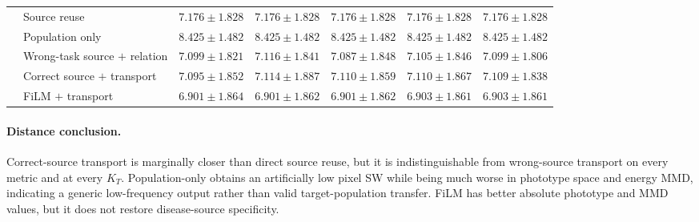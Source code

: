 \documentclass{article}
\newcommand{\KT}{K_T}
\begin{document}
\begin{table}[h]
{\begin{tabular}{llccccc}
& Source reuse & $7.176\pm1.828$ & $7.176\pm1.828$ & $7.176\pm1.828$ & $7.176\pm1.828$ & $7.176\pm1.828$ \\
& Population only & $8.425\pm1.482$ & $8.425\pm1.482$ & $8.425\pm1.482$ & $8.425\pm1.482$ & $8.425\pm1.482$ \\
& Wrong-task source $+$ relation & $7.099\pm1.821$ & $7.116\pm1.841$ & $7.087\pm1.848$ & $7.105\pm1.846$ & $7.099\pm1.806$ \\
& Correct source $+$ transport & $7.095\pm1.852$ & $7.114\pm1.887$ & $7.110\pm1.859$ & $7.110\pm1.867$ & $7.109\pm1.838$ \\
& FiLM $+$ transport & $6.901\pm1.864$ & $6.901\pm1.862$ & $6.901\pm1.862$ & $6.903\pm1.861$ & $6.903\pm1.861$ \\
\bottomrule
\end{tabular}}
\end{table}

\paragraph{Distance conclusion.}
Correct-source transport is marginally closer than direct source reuse, but it is indistinguishable from wrong-source transport on every metric and at every $\KT$. Population-only obtains an artificially low pixel SW while being much worse in phototype space and energy MMD, indicating a generic low-frequency output rather than valid target-population transfer. FiLM has better absolute phototype and MMD values, but it does not restore disease-source specificity.
\end{document}

